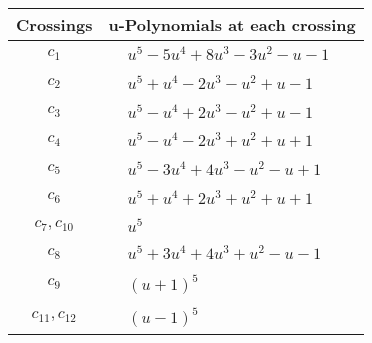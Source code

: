 \documentclass[1p]{elsarticle_modified}
\theoremstyle{definition}
\begin{document}
\begin{tabular}{m{50pt}|m{274pt}}
Crossings & \hspace{64pt}u-Polynomials at each crossing \\
\hline $$\begin{aligned}c_{1}\end{aligned}$$&$\begin{aligned}
&u^5-5 u^4+8 u^3-3 u^2- u-1
\end{aligned}$\\
\hline $$\begin{aligned}c_{2}\end{aligned}$$&$\begin{aligned}
&u^5+u^4-2 u^3- u^2+u-1
\end{aligned}$\\
\hline $$\begin{aligned}c_{3}\end{aligned}$$&$\begin{aligned}
&u^5- u^4+2 u^3- u^2+u-1
\end{aligned}$\\
\hline $$\begin{aligned}c_{4}\end{aligned}$$&$\begin{aligned}
&u^5- u^4-2 u^3+u^2+u+1
\end{aligned}$\\
\hline $$\begin{aligned}c_{5}\end{aligned}$$&$\begin{aligned}
&u^5-3 u^4+4 u^3- u^2- u+1
\end{aligned}$\\
\hline $$\begin{aligned}c_{6}\end{aligned}$$&$\begin{aligned}
&u^5+u^4+2 u^3+u^2+u+1
\end{aligned}$\\
\hline $$\begin{aligned}c_{7},c_{10}\end{aligned}$$&$\begin{aligned}
&u^5
\end{aligned}$\\
\hline $$\begin{aligned}c_{8}\end{aligned}$$&$\begin{aligned}
&u^5+3 u^4+4 u^3+u^2- u-1
\end{aligned}$\\
\hline $$\begin{aligned}c_{9}\end{aligned}$$&$\begin{aligned}
&(u+1)^5
\end{aligned}$\\
\hline $$\begin{aligned}c_{11},c_{12}\end{aligned}$$&$\begin{aligned}
&(u-1)^5
\end{aligned}$\\
\hline
\end{tabular}\\~\\
\end{document}

